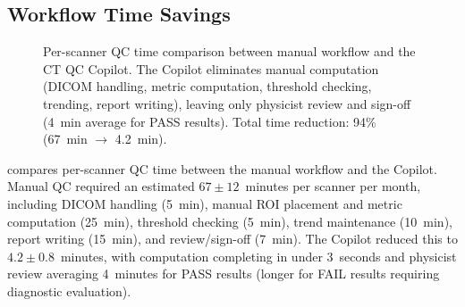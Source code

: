 \documentclass[11pt]{article}
\begin{document}
\subsection{Workflow Time Savings}

\begin{figure}[t]
\centering
{}
\caption{%
  Per-scanner QC time comparison between manual workflow and the
  CT QC Copilot.
  The Copilot eliminates manual computation (DICOM handling, metric
  computation, threshold checking, trending, report writing),
  leaving only physicist review and sign-off (4~min average for
  PASS results).
  Total time reduction: 94\% (67~min $\to$ 4.2~min).
}
\label{fig:time_comparison}
\end{figure}

 compares per-scanner QC time between
the manual workflow and the Copilot.
Manual QC required an estimated $67 \pm 12$~minutes per scanner
per month, including DICOM handling (5~min), manual ROI placement
and metric computation (25~min), threshold checking (5~min),
trend maintenance (10~min), report writing (15~min), and
review/sign-off (7~min).
The Copilot reduced this to $4.2 \pm 0.8$~minutes, with computation
completing in under 3~seconds and physicist review averaging 4~minutes
for PASS results (longer for FAIL results requiring diagnostic
evaluation).
\end{document}
